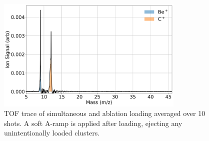 \begin{figure}[H]
	\centering
	\includegraphics[width=0.8\textwidth]{images/Be_C_TOF.png}
	\caption{TOF trace of simultaneous  and  ablation loading averaged over 10 shots. A soft A-ramp is applied after loading, ejecting any unintentionally loaded  clusters.}
	\label{fig: Be C TOF}
\end{figure}